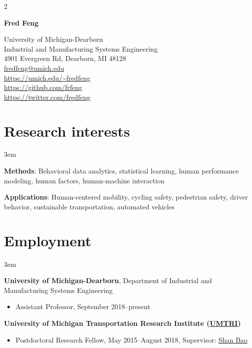 \documentclass[11pt]{article}
\title{\vspace{-6em}}   %
\author{}
\date{}
\newenvironment{main}
{\begin{adjustwidth}{3em}{}}
{\end{adjustwidth}}
\begin{document}
\maketitle

\begin{multicols}{2}

{\selectfont\Huge\textbf{Fred Feng}}  %

\hfill\break
\hfill\break
\hfill\break

\begin{flushright}
{
University of Michigan-Dearborn\\
Industrial and Manufacturing Systems Engineering\\
4901 Evergreen Rd, Dearborn, MI 48128\\
\href{mailto:fredfeng@umich.edu}{fredfeng@umich.edu}\\
\url{https://umich.edu/~fredfeng}\\
\url{https://github.com/frfeng}\\
\url{https://twitter.com/fredfeng}\\
}
\end{flushright}
\end{multicols}

\vspace{-6ex}
\noindent\makebox[\linewidth]{\rule{\textwidth}{0.8pt}}

\section*{Research interests}
\begin{main}

\textbf{Methods}:
Behavioral data analytics,
statistical learning,
human performance modeling,
human factors,
human-machine interaction

\textbf{Applications}:
Human-centered mobility,
cycling safety,
pedestrian safety,
driver behavior,
sustainable transportation,
automated vehicles

\end{main}
\section*{Employment}
\begin{main}

\textbf{University of Michigan-Dearborn}, Department of Industrial and Manufacturing Systems Engineering

\begin{itemize}
    \item[] Assistant Professor, September 2018–present
\end{itemize}

\textbf{University of Michigan Transportation Research Institute (\href{http://www.umtri.umich.edu/}{UMTRI})}

\begin{itemize}
    \item[] Postdoctoral Research Fellow, May 2015–August 2018, Supervisor: \href{https://sites.google.com/umich.edu/hfet-lab/people}{Shan Bao}
\end{itemize}


\end{main}
\end{document}
